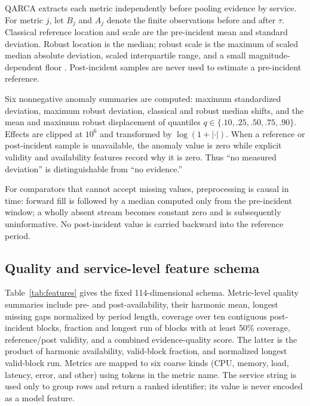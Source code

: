 \documentclass[runningheads]{llncs}
\begin{document}
QARCA extracts each metric independently before pooling evidence by service.
For metric $j$, let $B_j$ and $A_j$ denote the finite observations before and
after $\tau$. Classical reference location and scale are the pre-incident mean
and standard deviation. Robust location is the median; robust scale is the
maximum of scaled median absolute deviation, scaled interquartile range, and a
small magnitude-dependent floor \cite{rousseeuw1993}. Post-incident samples are never used to
estimate a pre-incident reference.

Six nonnegative anomaly summaries are computed: maximum standardized
deviation, maximum robust deviation, classical and robust median shifts, and
the mean and maximum robust displacement of quantiles
$q\in\{.10,.25,.50,.75,.90\}$. Effects are clipped at $10^6$ and transformed
by $\log(1+|\cdot|)$. When a reference or post-incident sample is unavailable,
the anomaly value is zero while explicit validity and availability features
record why it is zero. Thus ``no measured deviation'' is distinguishable from
``no evidence.''

For comparators that cannot accept missing values, preprocessing is causal in
time: forward fill is followed by a median computed only from the pre-incident
window; a wholly absent stream becomes constant zero and is subsequently
uninformative. No post-incident value is carried backward into the reference
period.

\subsection{Quality and service-level feature schema}

Table~\ref{tab:features} gives the fixed 114-dimensional schema. Metric-level
quality summaries include pre- and post-availability, their harmonic mean,
longest missing gaps normalized by period length, coverage over ten contiguous
post-incident blocks, fraction and longest run of blocks with at least 50\%
coverage, reference/post validity, and a combined evidence-quality score. The
latter is the product of harmonic availability, valid-block fraction, and
normalized longest valid-block run. Metrics are mapped to six
coarse kinds (CPU, memory, load, latency, error, and other) using tokens in the
metric name. The service string is used only to group rows and return a ranked
identifier; its value is never encoded as a model feature.
\end{document}
